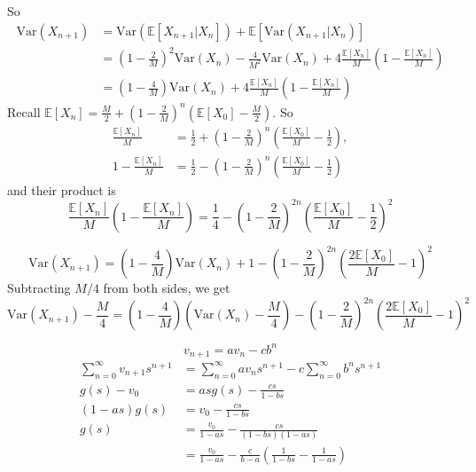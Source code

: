 \documentclass[letterpaper]{beamer}
\def\E{\mathbb E}
\def\V{\mathrm{Var}}
\begin{document}
\begin{frame}
So
\begin{align*}
\V(X_{n+1})&=\V(\E[X_{n+1}|X_n])+\E[\V(X_{n+1}|X_n)]\\
&=\left(1\!-\!\frac{2}{M}\right)^2\V(X_n)-\frac{4}{M^2}\V(X_n)+4\frac{\E[X_n]}{M}\left(1-\frac{\E[X_n]}{M}\right)\\
&=\left(1-\frac{4}{M}\right)\V(X_n)+4\frac{\E[X_n]}{M}\left(1-\frac{\E[X_n]}{M}\right)
\end{align*}
Recall $\E[X_n]=\frac{M}{2}+\left(1-\frac{2}{M}\right)^n(\E[X_{0}]-\frac{M}{2})$. So
\begin{align*}
\frac{\E[X_n]}{M}&=\frac{1}{2}+\left(1-\frac{2}{M}\right)^n\left(\frac{\E[X_{0}]}{M}-\frac{1}{2}\right),\\
1-\frac{\E[X_n]}{M}&=\frac{1}{2}-\left(1-\frac{2}{M}\right)^n\left(\frac{\E[X_{0}]}{M}-\frac{1}{2}\right)
\end{align*}
and their product is
$$
\frac{\E[X_n]}{M}\left(1-\frac{\E[X_n]}{M}\right)
=\frac{1}{4}-\left(1-\frac{2}{M}\right)^{2n}\left(\frac{\E[X_{0}]}{M}-\frac{1}{2}\right)^2
$$
\end{frame}
\begin{frame}\small
$$
\V(X_{n+1})=\left(1-\frac{4}{M}\right)\V(X_n)+1-\left(1-\frac{2}{M}\right)^{2n}\left(\frac{2\E[X_{0}]}{M}-1\right)^2
$$
Subtracting $M/4$ from both sides, we get
$$
\V(X_{n+1})-\frac{M}{4}=\left(1-\frac{4}{M}\right)\left(\V(X_n)-\frac{M}{4}\right)-\left(1-\frac{2}{M}\right)^{2n}\left(\frac{2\E[X_{0}]}{M}-1\right)^2
$$

$$
v_{n+1}=av_n-cb^n
$$
\begin{align*}
\sum_{n=0}^{\infty}v_{n+1}s^{n+1}&=\sum_{n=0}^{\infty}av_ns^{n+1}-c\sum_{n=0}^{\infty}b^ns^{n+1}\\
g(s)-v_0 &=asg(s)-\frac{cs}{1-bs}\\
(1-as)g(s)&=v_0-\frac{cs}{1-bs}\\
g(s)&=\frac{v_0}{1-as}-\frac{cs}{(1-bs)(1-as)}\\
&=\frac{v_0}{1-as}-\frac{c}{b-a}\left(\frac{1}{1-bs}-\frac{1}{1-as}\right)\\
\end{align*}
\end{frame}
\end{document}
